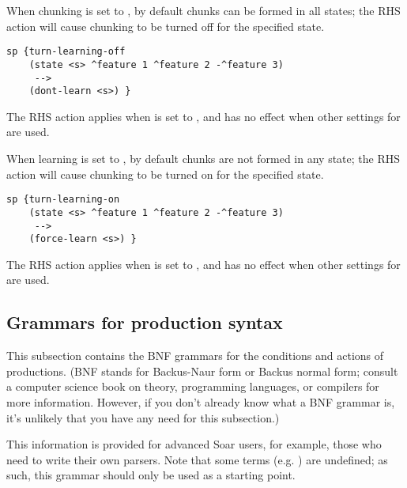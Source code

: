 \begin{description}
\item [\soarb{dont-learn} --- ] When chunking is set to ,
        by default chunks can be formed in all states; the 
        RHS action will cause chunking to be turned off for the specified
        state.

\begin{verbatim}
sp {turn-learning-off
    (state <s> ^feature 1 ^feature 2 -^feature 3)
     -->
    (dont-learn <s>) }
\end{verbatim}

        The  RHS action applies when  is 
	    set to , and has no effect when other settings for
         are used.


\item [\soarb{force-learn} --- ] When learning is set to ,
        by default chunks are not formed in any state; the 
        RHS action will cause chunking to be turned on for the specified
        state.

\begin{verbatim}
sp {turn-learning-on
    (state <s> ^feature 1 ^feature 2 -^feature 3)
     -->
    (force-learn <s>) }
\end{verbatim}

        The  RHS action applies when 
	    is set to , and has no effect when other settings for
         are used.

\end{description}
\subsection{Grammars for production syntax} 
\label{GRAMMARS}

This subsection contains the BNF grammars for the conditions and actions of
productions. (BNF stands for Backus-Naur form or Backus normal form; consult a
computer science book on theory, programming languages, or compilers for more
information. However, if you don't already know what a BNF grammar is, it's
unlikely that you have any need for this subsection.)

This information is provided for advanced Soar users, for example, those who
need to write their own parsers. Note that some terms (e.g. )
are undefined; as such, this grammar should only be used as a starting point.

